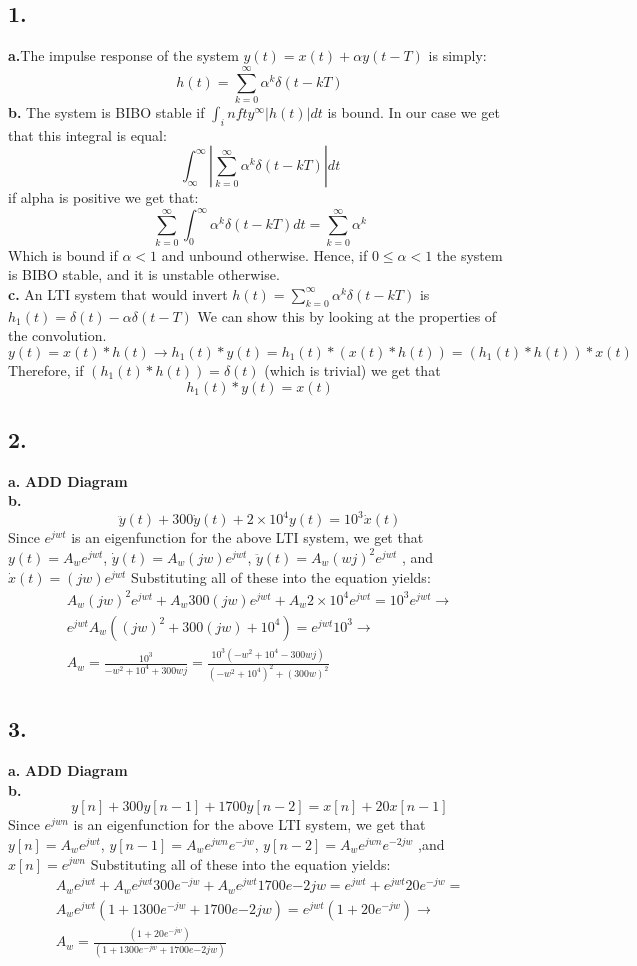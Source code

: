 \documentclass[11pt]{article}
\begin{document}
\subsection*{1.}
\textbf{a.}The impulse response of the system $y(t) = x(t) + \alpha y(t - T)$  is simply:
\[h(t) = \sum_{k = 0}^\infty \alpha^k \delta(t - kT)  \]
\textbf{b.}
The system is BIBO stable if $\int_infty^\infty |h(t)|dt$ is bound. In our case we get that this integral is equal:
\[\int_\infty^\infty |\sum_{k = 0}^\infty \alpha^k \delta(t - kT)| dt\]
if alpha is positive we get that:
\[
\sum_{k = 0}^\infty \int_0^\infty \alpha^k \delta(t - kT)dt  = 
\sum_{k = 0}^\infty \alpha^k
\]
Which is bound if $\alpha < 1$ and unbound otherwise.
Hence, if $0 \leq \alpha < 1$ the system is BIBO stable, and it is unstable otherwise.\\
\textbf{c.}
An LTI system that would invert $h(t) = \sum_{k = 0}^\infty \alpha^k \delta(t - kT)$ is 
$\boxed{h_1(t) = \delta(t) - \alpha \delta(t - T)}$
We can show this by looking at the properties of the convolution.
\[y(t) = x(t) * h(t) \rightarrow h_1(t) * y(t) = h_1(t) * (x(t) * h(t)) = (h_1(t) * h(t)) * x(t)\]
Therefore, if $(h_1(t) * h(t)) = \delta(t)$ (which is trivial) we get that 
\[ h_1(t) * y(t)  = x(t)\]

\subsection*{2.}
\textbf{a.}
\textbf{ADD Diagram}\\
\textbf{b.}
\[\ddot{y}(t) + 300\dot{y}(t) + 2 \times 10^4 y(t) = 10^3 \dot{x}(t) \]
Since $e^{jwt}$ is an eigenfunction for the above LTI system, we get that
$y(t) = A_w e^{jwt}$, $\dot{y}(t) = A_w (jw) e^{jwt}$, $\ddot{y}(t) = A_w (wj)^2 e^{jwt}$
, and $\dot{x}(t) = (jw) e^{jwt}$ Substituting all of these into the equation yields:
\begin{align*}
A_w (jw)^2 e^{jwt} + A_w 300 (jw) e^{jwt} + A_w 2 \times 10^4 e^{jwt} = 10^3 e^{jwt} \rightarrow\\
e^{jwt} A_w ( (jw)^2 + 300(jw) + 10^4 ) = e^{jwt} 10^3 \rightarrow \\
A_w = \frac{10^3}{-w^2 + 10^4 + 300 w j}  = 
\boxed{\frac{10^3 (-w^2 + 10^4 - 300wj)}{ (-w^2 + 10^4)^2 + (300 w)^2}}
\end{align*}
\subsection*{3.}
\textbf{a.}
\textbf{ADD Diagram}\\
\textbf{b.}
\[y[n] + 300 y[n - 1] + 1700 y[n - 2] = x[n] + 20x[n-1]\]
Since $e^{jwn}$ is an eigenfunction for the above LTI system, we get that
$y[n] = A_w e^{jwt}$, $y[n - 1] = A_w e^{jwn} e^{-jw}$, $y[n - 2] = A_w  e^{jwn} e^{-2jw}$
,and $x[n] = e^{jwn}$ Substituting all of these into the equation yields:
\begin{align*}
A_w e^{jwt} + A_w e^{jwt}300  e^{-jw} + A_w e^{jwt} 1700 e{-2jw} =e^{jwt} + e^{jwt} 20 e^{-jw}= \\
A_w e^{jwt}(1 +  1300  e^{-jw} + 1700 e{-2jw}) =e^{jwt}(1 + 20e^{-jw}) \rightarrow \\
\boxed{A_w = \frac{(1 + 20e^{-jw})}{(1 +  1300  e^{-jw} + 1700 e{-2jw})}}
\end{align*}
\end{document}
